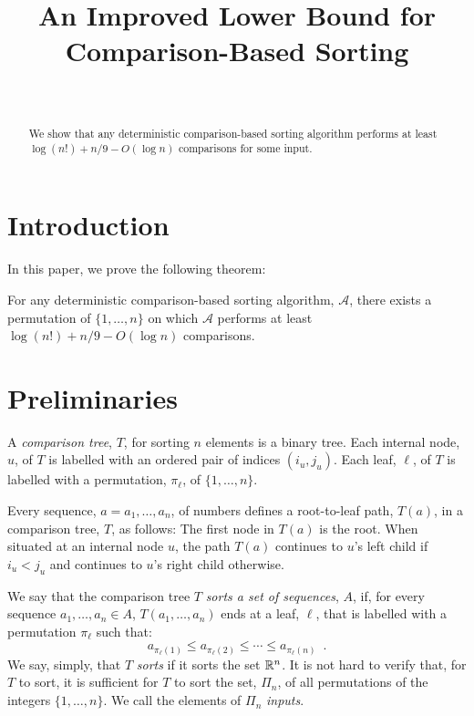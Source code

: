 \documentclass{patmorin}
\title{An Improved Lower Bound for Comparison-Based Sorting}
\author{\ }
\begin{document}
\maketitle

\begin{abstract}
We show that any deterministic comparison-based sorting algorithm performs
at least $\log(n!) + n/9 - O(\log n)$ comparisons for some input.
\end{abstract}

\section{Introduction}

In this paper, we prove the following theorem:

\begin{thm}
  For any deterministic comparison-based sorting algorithm, $\mathcal{A}$,
  there exists a permutation of $\{1,\ldots,n\}$ on which $\mathcal{A}$
  performs at least $\log(n!)+n/9-O(\log n)$ comparisons.
\end{thm}

\section{Preliminaries}

A \emph{comparison tree}, $T$, for sorting $n$ elements is a binary tree.
Each internal node, $u$, of $T$ is labelled with an ordered pair of
indices $(i_u,j_u)$.  Each leaf, $\ell$, of $T$ is labelled with a
permutation, $\pi_\ell$, of $\{1,\ldots,n\}$.

Every sequence, $a=a_1,\ldots,a_n$, of numbers defines a root-to-leaf
path, $T(a)$, in a comparison tree, $T$, as follows:  The first node
in $T(a)$ is the root.  When situated at an internal node $u$, the path
$T(a)$ continues to $u$'s left child if $i_u < j_u$ and continues to
$u$'s right child otherwise.

We say that the comparison tree $T$ \emph{sorts a set of sequences}, $A$,
if, for every sequence $a_1,\ldots,a_n\in A$, $T(a_1,\ldots,a_n)$ ends at
a leaf, $\ell$, that is labelled with a permutation $\pi_\ell$ such that:
\[
    a_{\pi_\ell(1)} \le a_{\pi_\ell(2)} 
        \le \cdots \le a_{\pi_\ell(n)} \enspace .
\]
We say, simply, that $T$ \emph{sorts} if it sorts the set $\mathbb{R}^n$.  It is
not hard to verify that, for $T$ to sort, it is sufficient for $T$ to sort
the set, $\Pi_n$, of all permutations of the integers $\{1,\ldots,n\}$. We call the elements of $\Pi_n$ \emph{inputs}.
\end{document}

